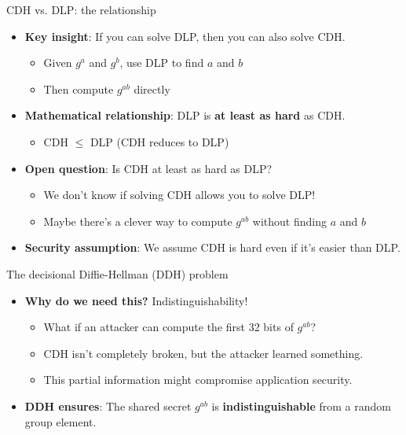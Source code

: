 \documentclass[aspectratio=169, lualatex, handout]{beamer}
\begin{document}
\begin{frame}{CDH vs. DLP: the relationship}
	\begin{itemize}[<+->]
		\item \textbf{Key insight}: If you can solve DLP, then you can also solve CDH.
		      \begin{itemize}
			      \item Given $g^a$ and $g^b$, use DLP to find $a$ and $b$
			      \item Then compute $g^{ab}$ directly
		      \end{itemize}
		\item \textbf{Mathematical relationship}: DLP is \textbf{at least as hard} as CDH.
		      \begin{itemize}
			      \item CDH $\leq$ DLP (CDH reduces to DLP)
		      \end{itemize}
		\item \textbf{Open question}: Is CDH at least as hard as DLP?
		      \begin{itemize}
			      \item We don't know if solving CDH allows you to solve DLP!
			      \item Maybe there's a clever way to compute $g^{ab}$ without finding $a$ and $b$
		      \end{itemize}
		\item \textbf{Security assumption}: We assume CDH is hard even if it's easier than DLP.
	\end{itemize}
\end{frame}

\begin{frame}{The decisional Diffie-Hellman (DDH) problem}
	\begin{itemize}[<+->]
		\item \textbf{Why do we need this?} Indistinguishability!
		      \begin{itemize}
			      \item What if an attacker can compute the first 32 bits of $g^{ab}$?
			      \item CDH isn't completely broken, but the attacker learned something.
			      \item This partial information might compromise application security.
		      \end{itemize}
		\item \textbf{DDH ensures}: The shared secret $g^{ab}$ is \textbf{indistinguishable} from a random group element.
	\end{itemize}
\end{frame}
\end{document}
